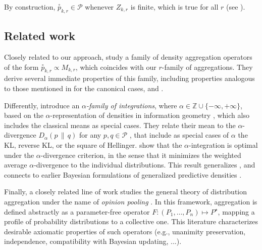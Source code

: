 \documentclass[accepted]{uai2026} %
\newcommand{\Z}{\mathbb{Z}}
\newcommand{\compose}[1]{\overset{\circ}{#1}}
\begin{document}
By construction, $\compose{p}_{k,r} \in \mathcal{P}$ whenever $Z_{k,r}$ is finite, which is true for all $r$ (see ).


\subsection{Related work}

Closely related to our approach, \citet{cooke1991experts} study a family of density aggregation operators of the form $\compose{p}_{k,r} \propto M_{k,r}$, which coincides with our $r$-family of aggregations. They derive several immediate properties of this family, including properties analogous to those mentioned in  for the canonical cases, and .

Differently, \citet{amari2007integration} introduce an \emph{$\alpha$-family of integrations}, where $\alpha \in \Z \cup \{ -\infty,+\infty \}$, based on the $\alpha$-representation of densities in information geometry  \citep{amari2000methods}, which also includes the classical means as special cases. They relate their mean to the $\alpha$-divergence
$D_{\alpha}(p \,\|\, q)$ for any $p,q \in \mathcal{P}$ \citep{chernoff1952measure,amari2000methods}, that include as special cases of $\alpha$ the KL, reverse KL, or the square of Hellinger. \citet[Theorem~2]{amari2007integration} show that the $\alpha$-integration is optimal under the $\alpha$-divergence criterion, in the sense that it minimizes the weighted average $\alpha$-divergence to the individual distributions. This result generalizes , and connects to earlier Bayesian formulations of generalized predictive densities \citep{corcuera1999generalized}.

Finally, a closely related line of work studies the general theory of distribution aggregation under the name of \emph{opinion pooling} \citep{elkin2025opinion}. In this framework, aggregation is defined abstractly as a parameter-free operator
$F : (P_1,\dots,P_n) \mapsto P^\star$,
mapping a profile of probability distributions to a collective one. This literature characterizes desirable axiomatic properties of such operators (e.g., unanimity preservation, independence, compatibility with Bayesian updating, ...).






\end{document}
